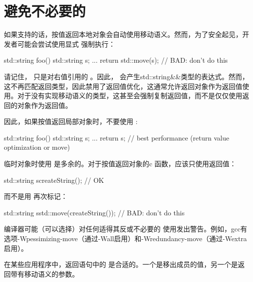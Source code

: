 \section{避免不必要的 }
如果支持的话，按值返回本地对象会自动使用移动语义。然而，为了安全起见，开发者可能会尝试使用显式  强制执行：

\begin{cppcode}
std::string foo()
{
	std::string s;
	...
	return std::move(s); // BAD: don’t do this
}
\end{cppcode}

请记住， 只是对右值引用的 。因此， 会产生std::string\&\&类型的表达式。然而，这不再匹配返回类型，因此禁用了返回值优化，这通常允许返回对象作为返回值使用。对于没有实现移动语义的类型，这甚至会强制复制返回值，而不是仅仅使用返回的对象作为返回值。

因此，如果按值返回局部对象时，不要使用 :

\begin{cppcode}
std::string foo()
{
	std::string s;
	...
	return s; // best performance (return value optimization or move)
}
\end{cppcode}

临时对象时使用  是多余的。对于按值返回对象的c 函数，应该只使用返回值：

\begin{cppcode}
std::string s{createString()}; // OK
\end{cppcode}

而不是用  再次标记：

\begin{cppcode}
std::string s{std::move(createString())}; // BAD: don’t do this
\end{cppcode}

编译器可能（可以选择）对任何适得其反或不必要的  使用发出警告。例如，gcc有选项-Wpessimizing-move（通过-Wall启用）和-Wredundancy-move（通过-Wextra启用）。

在某些应用程序中，返回语句中的  是合适的。一个是移出成员的值，另一个是返回带有移动语义的参数。
















